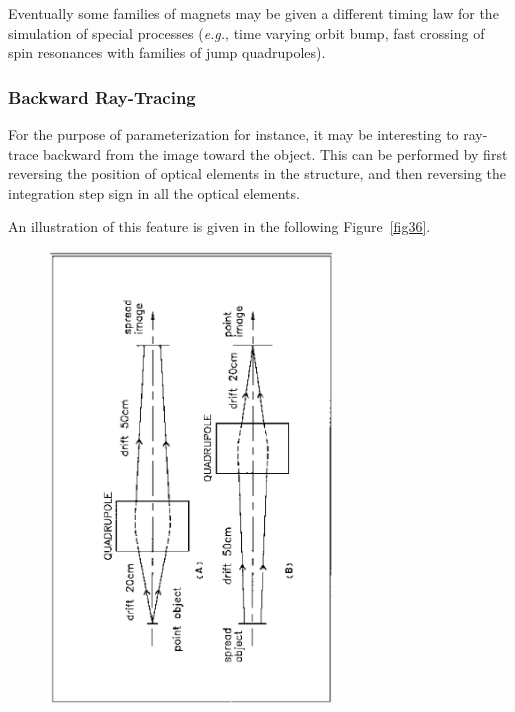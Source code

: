 \medskip

\noindent Eventually some families of magnets may be given a different timing law 
    for the simulation of special processes (\emph{e.g.}, time varying orbit bump, 
fast crossing of spin resonances with families of jump quadrupoles). 


\subsubsection{Backward Ray-Tracing} \label{sec4.6.3} 
 

For the purpose of parameterization for instance, it may be interesting to ray-trace 
backward  from the image toward the object.  This can be performed by first 
reversing the position of optical elements in the structure, and then 
reversing the integration step sign in all the optical elements.  
\medskip

\noindent An illustration of this feature is given in the following
Figure~\ref{fig36}.    


\begin{figure}[H]
\centerline{\includegraphics[height=12cm,angle=-90]{Fig36.ps}}
\end{figure}



